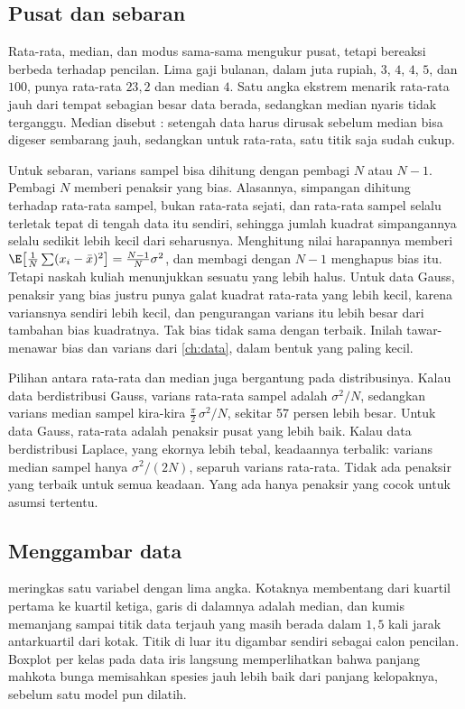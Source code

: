 \subsection{Pusat dan sebaran}

Rata-rata, median, dan modus sama-sama mengukur pusat, tetapi bereaksi berbeda terhadap pencilan. Lima gaji bulanan, dalam
juta rupiah, $3$, $4$, $4$, $5$, dan $100$, punya rata-rata $23{,}2$ dan median $4$. Satu angka ekstrem menarik rata-rata jauh
dari tempat sebagian besar data berada, sedangkan median nyaris tidak terganggu. Median disebut : setengah
data harus dirusak sebelum median bisa digeser sembarang jauh, sedangkan untuk rata-rata, satu titik saja sudah cukup.

Untuk sebaran, varians sampel bisa dihitung dengan pembagi $N$ atau $N-1$. Pembagi $N$ memberi penaksir yang bias. Alasannya,
simpangan dihitung terhadap rata-rata sampel, bukan rata-rata sejati, dan rata-rata sampel selalu terletak tepat di tengah
data itu sendiri, sehingga jumlah kuadrat simpangannya selalu sedikit lebih kecil dari seharusnya. Menghitung nilai
harapannya memberi $\E\big[\tfrac1N\sum(x_i-\bar x)^2\big]=\tfrac{N-1}N\sigma^2$, dan membagi dengan $N-1$ menghapus bias itu.
Tetapi naskah kuliah menunjukkan sesuatu yang lebih halus. Untuk data Gauss, penaksir yang bias justru punya galat kuadrat
rata-rata yang lebih kecil, karena variansnya sendiri lebih kecil, dan pengurangan varians itu lebih besar dari tambahan
bias kuadratnya. Tak bias tidak sama dengan terbaik. Inilah tawar-menawar bias dan varians dari \cref{ch:data}, dalam
bentuk yang paling kecil.

Pilihan antara rata-rata dan median juga bergantung pada distribusinya. Kalau data berdistribusi Gauss, varians rata-rata
sampel adalah $\sigma^2/N$, sedangkan varians median sampel kira-kira $\tfrac\pi2\,\sigma^2/N$, sekitar 57 persen lebih besar.
Untuk data Gauss, rata-rata adalah penaksir pusat yang lebih baik. Kalau data berdistribusi Laplace, yang ekornya lebih tebal,
keadaannya terbalik: varians median sampel hanya $\sigma^2/(2N)$, separuh varians rata-rata. Tidak ada penaksir yang terbaik
untuk semua keadaan. Yang ada hanya penaksir yang cocok untuk asumsi tertentu.

\subsection{Menggambar data}

 meringkas satu variabel dengan lima angka. Kotaknya membentang dari kuartil pertama ke kuartil ketiga, garis di
dalamnya adalah median, dan kumis memanjang sampai titik data terjauh yang masih berada dalam $1{,}5$ kali jarak antarkuartil
dari kotak. Titik di luar itu digambar sendiri sebagai calon pencilan. Boxplot per kelas pada data iris langsung
memperlihatkan bahwa panjang mahkota bunga memisahkan spesies jauh lebih baik dari panjang kelopaknya, sebelum satu model
pun dilatih.

